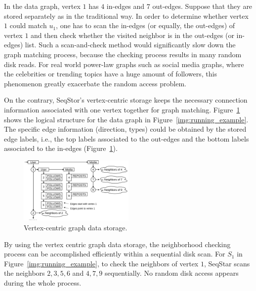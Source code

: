 In the data graph, vertex $1$ has $4$ in-edges and $7$ out-edges.
Suppose that they are stored separately as in the traditional way.
In order to determine whether vertex $1$ could match $u_1$,
one has to scan the in-edges (or equally, the out-edges) of vertex $1$ and then check whether the visited neighbor is in the out-edges (or in-edges) list.
Such a scan-and-check method would significantly slow down the graph matching process,
because the checking process results in many random disk reads.
For real world power-law graphs such as social media graphs, where the celebrities or trending topics have a huge amount of followers, this phenomenon greatly exacerbate the random access problem.

On the contrary, SeqStor's vertex-centric storage keeps the necessary connection information associated with one vertex together for graph matching.
Figure~\ref{img:data_example} shows the logical structure for the data graph in Figure~\ref{img:running_example}.
The specific edge information (direction, types) could be obtained by the stored edge labels, i.e., the top labels associated to the out-edges and the bottom labels associated to the in-edges (Figure~\ref{img:data_example}).

\begin{figure}[ht]
  \centering
  \includegraphics[width=0.5\textwidth]{img/data_example.pdf}
  \caption{Vertex-centric graph data storage.}\label{img:data_example}
\end{figure}

By using the vertex centric graph data storage, the neighborhood checking process can be accomplished efficiently within a sequential disk scan.
For $S_1$ in Figure~\ref{img:running_example},
to check the neighbors of vertex $1$, SeqStar scans the neighbors $2, 3, 5, 6$ and $4, 7, 9$ sequentially.
No random disk access appears during the whole process.
